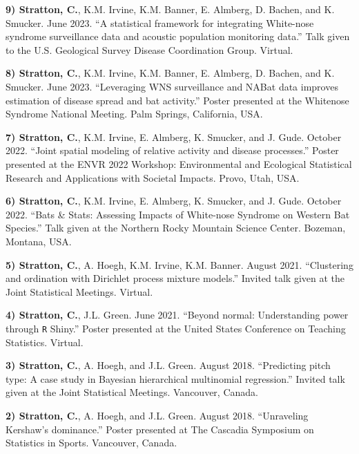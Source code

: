 \documentclass[a4paper]{article}
\begin{document}
\textbf{9) Stratton, C.}, K.M. Irvine, K.M. Banner, E. Almberg, D.
Bachen, and K. Smucker. June 2023. ``A statistical framework for
integrating White-nose syndrome surveillance data and acoustic
population monitoring data.'' Talk given to the U.S. Geological Survey
Disease Coordination Group. Virtual. \vspace*{2mm}

\textbf{8) Stratton, C.}, K.M. Irvine, K.M. Banner, E. Almberg, D.
Bachen, and K. Smucker. June 2023. ``Leveraging WNS surveillance and
NABat data improves estimation of disease spread and bat activity.''
Poster presented at the Whitenose Syndrome National Meeting. Palm
Springs, California, USA. \vspace*{2mm}

\textbf{7) Stratton, C.}, K.M. Irvine, E. Almberg, K. Smucker, and J.
Gude. October 2022. ``Joint spatial modeling of relative activity and
disease processes.'' Poster presented at the ENVR 2022 Workshop:
Environmental and Ecological Statistical Research and Applications with
Societal Impacts. Provo, Utah, USA. \vspace*{2mm}

\textbf{6) Stratton, C.}, K.M. Irvine, E. Almberg, K. Smucker, and J.
Gude. October 2022. ``Bats \& Stats: Assessing Impacts of White-nose
Syndrome on Western Bat Species.'' Talk given at the Northern Rocky
Mountain Science Center. Bozeman, Montana, USA. \vspace*{2mm}

\textbf{5) Stratton, C.}, A. Hoegh, K.M. Irvine, K.M. Banner. August
2021. ``Clustering and ordination with Dirichlet process mixture
models.'' Invited talk given at the Joint Statistical Meetings. Virtual.
\vspace*{2mm}

\textbf{4) Stratton, C.}, J.L. Green. June 2021. ``Beyond normal:
Understanding power through \texttt{R} Shiny.'' Poster presented at the
United States Conference on Teaching Statistics. Virtual. \vspace*{2mm}

\textbf{3) Stratton, C.}, A. Hoegh, and J.L. Green. August 2018.
``Predicting pitch type: A case study in Bayesian hierarchical
multinomial regression.'' Invited talk given at the Joint Statistical
Meetings. Vancouver, Canada. \vspace*{2mm}

\textbf{2) Stratton, C.}, A. Hoegh, and J.L. Green. August 2018.
``Unraveling Kershaw's dominance.'' Poster presented at The Cascadia
Symposium on Statistics in Sports. Vancouver, Canada. \vspace*{2mm}
\end{document}
